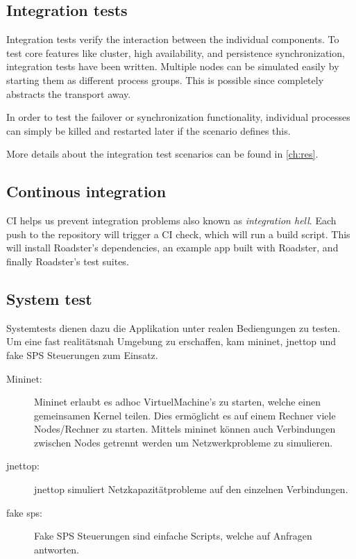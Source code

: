 \subsection{Integration tests}
Integration tests verify the interaction between the individual components.
To test core features like cluster, high availability, and persistence
synchronization, integration tests have been written. Multiple nodes can be
simulated easily by starting them as different process groups. This is possible
since \zmq completely abstracts the transport away.

In order to test the failover or synchronization functionality, individual processes
can simply be killed and restarted later if the scenario defines this.

More details about the integration test scenarios can be found in \autoref{ch:res}.

\subsection{Continous integration}
\gls{CI} helps us prevent integration problems also known as \emph{integration
hell}. Each push to the repository will trigger a CI check, which will run a
build script. This will install Roadster's dependencies, an example app built
with Roadster, and finally Roadster's test suites.

\subsection{System test}
Systemtests dienen dazu die Applikation unter realen Bediengungen zu testen. Um eine fast realitätsnah
Umgebung zu erschaffen, kam mininet, jnettop und fake SPS Steuerungen zum Einsatz.
\begin{description}
	\item [Mininet:]
		Mininet erlaubt es adhoc VirtuelMachine's zu starten, 
		welche einen gemeinsamen Kernel teilen.
		Dies ermöglicht es auf einem Rechner viele Nodes/Rechner zu starten. 
		Mittels mininet können auch Verbindungen zwischen Nodes getrennt werden
		um Netzwerkprobleme zu simulieren. 
	\item [jnettop:]
		jnettop simuliert Netzkapazitätprobleme auf den einzelnen Verbindungen.
	\item [fake sps:]
		Fake SPS Steuerungen sind einfache Scripts, welche auf Anfragen antworten.
\end{description}

